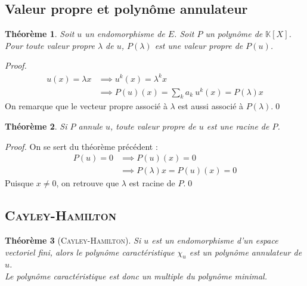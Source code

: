 \documentclass[11pt,a4paper]{report}
\newtheorem{theorem}{Théorème}[chapter]
\newtheorem{itheorem}[theorem]{Théorème}
\theoremstyle{definition}
\begin{document}
\subsection{Valeur propre et polynôme annulateur} %
\label{sub:valeur_propre_et_polynome_annulateur}
\begin{theorem}
     Soit $u$ un endomorphisme de $E$. Soit $P$ un polynôme de $\mathbb{K} [X]$.\\
     Pour toute valeur propre $\lambda$ de $u$, $P(\lambda)$ est une valeur propre de $P(u)$.
\end{theorem}
\begin{proof}
     \begin{align*}
         u(x) = \lambda x   &\implies u^k(x) = \lambda^k x \\
                            &\implies P(u)(x) = \sum_k a_k~u^k(x) = P(\lambda)x
     \end{align*}
     On remarque que le vecteur propre associé à $\lambda$ est aussi associé à $P(\lambda )$.\qed
\end{proof}
\begin{itheorem}
     Si $P$ annule $u$, toute valeur propre de $u$ est une racine de $P$.
\end{itheorem}
\begin{proof}
     On se sert du théorème précédent : 
     \begin{align*}
          P(u) = 0 &\implies P(u)(x) = 0\\
                   &\implies P(\lambda)x = P(u)(x) = 0
     \end{align*}
     Puisque $x\neq 0$, on retrouve que $\lambda$ est racine de $P$.\qed
\end{proof}

\subsection{\textsc{Cayley}-\textsc{Hamilton}} %
\label{sub:Cayley-Hamilton}
\begin{itheorem}[\textsc{Cayley-Hamilton}%
]
Si $u$ est un endomorphisme d'un espace vectoriel \emph{fini}, alors le polynôme caractéristique $\chi_u$ est un polynôme annulateur de $u$. \\
Le polynôme caractéristique est donc un multiple du polynôme minimal. 
\end{itheorem}
\end{document}
